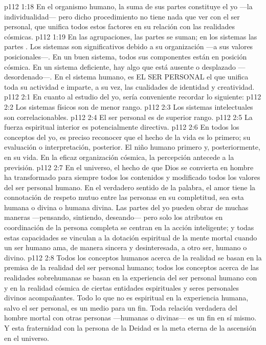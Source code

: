 \vs p112 1:18 En el organismo humano, la suma de sus partes constituye el yo ---la individualidad--- pero dicho procedimiento no tiene nada que ver con el ser personal, que unifica todos estos factores en su relación con las realidades cósmicas.
\vs p112 1:19 En las agrupaciones, las partes se suman; en los sistemas las partes . Los sistemas son significativos debido a su organización ---a sus valores posicionales---. En un buen sistema, todos sus componentes están en posición cósmica. En un sistema deficiente, hay algo que está ausente o desplazado ---desordenado---. En el sistema humano, es EL SER PERSONAL el que unifica toda su actividad e imparte, a su vez, las cualidades de identidad y creatividad.
\vs p112 2:1 En cuanto al estudio del yo, sería conveniente recordar lo siguiente:
\vs p112 2:2 Los sistemas físicos son de menor rango.
\vs p112 2:3 Los sistemas intelectuales son correlacionables.
\vs p112 2:4 El ser personal es de superior rango.
\vs p112 2:5 La fuerza espiritual interior es potencialmente directiva.
\vs p112 2:6 \pc En todos los conceptos del yo, es preciso reconocer que el hecho de la vida es lo primero; su evaluación o interpretación, posterior. El niño humano primero  y, posteriormente,  en su vida. En la eficaz organización cósmica, la percepción antecede a la previsión.
\vs p112 2:7 \pc En el universo, el hecho de que Dios se convierta en hombre ha transformado para siempre todos los contenidos y modificado todos los valores del ser personal humano. En el verdadero sentido de la palabra, el amor tiene la connotación de respeto mutuo entre las personas en su completitud, sea esta humana o divina o humana  divina. Las partes del yo pueden obrar de muchas maneras ---pensando, sintiendo, deseando--- pero solo los atributos en coordinación de la persona completa se centran en la acción inteligente; y todas estas capacidades se vinculan a la dotación espiritual de la mente mortal cuando un ser humano ama, de manera sincera y desinteresada, a otro ser, humano o divino.
\vs p112 2:8 Todos los conceptos humanos acerca de la realidad se basan en la premisa de la realidad del ser personal humano; todos los conceptos acerca de las realidades sobrehumanas se basan en la experiencia del ser personal humano con y en la realidad cósmica de ciertas entidades espirituales y seres personales divinos acompañantes. Todo lo que no es espiritual en la experiencia humana, salvo el ser personal, es un medio para un fin. Toda relación verdadera del hombre mortal con otras personas ---humanas o divinas--- es un fin en sí mismo. Y esta fraternidad con la persona de la Deidad es la meta eterna de la ascensión en el universo.
